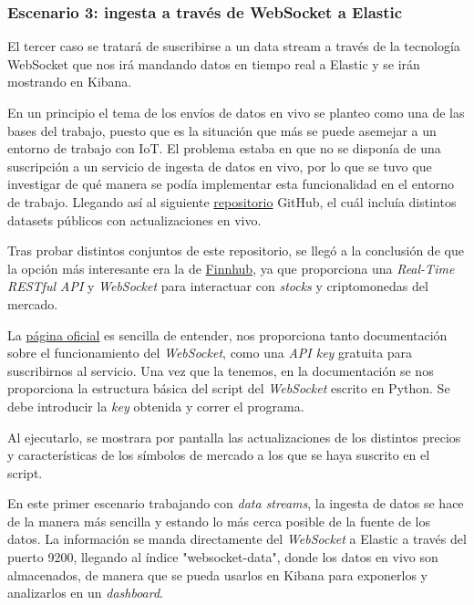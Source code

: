 \subsubsection{Escenario 3: ingesta a través de WebSocket a Elastic}

El tercer caso se tratará de suscribirse a un data stream a través de la tecnología WebSocket que nos irá mandando datos en tiempo real a Elastic y se irán mostrando en Kibana.

En un principio el tema de los envíos de datos en vivo se planteo como una de las bases del trabajo, puesto que es la situación que más se puede asemejar a un entorno de trabajo con IoT. El problema estaba en que no se disponía de una suscripción a un servicio de ingesta de datos en vivo, por lo que se tuvo que investigar de qué manera se podía implementar esta funcionalidad en el entorno de trabajo. Llegando así al siguiente \href{https://github.com/ColinEberhardt/awesome-public-streaming-datasets}{repositorio} GitHub, el cuál incluía distintos datasets públicos con actualizaciones en vivo.

Tras probar distintos conjuntos de este repositorio, se llegó a la conclusión de que la opción más interesante era la de \href{https://finnhub.io/docs/api/websocket-trades}{Finnhub}, ya que proporciona una \textit{Real-Time RESTful API} y \textit{WebSocket} para interactuar con \textit{stocks} y criptomonedas del mercado.

La \href{https://finnhub.io/}{página oficial} es sencilla de entender, nos proporciona tanto documentación sobre el funcionamiento del \textit{WebSocket}, como una \textit{API key} gratuita para suscribirnos al servicio. Una vez que la tenemos, en la documentación se nos proporciona la estructura básica del script del \textit{WebSocket} escrito en Python. Se debe introducir la \textit{key} obtenida y correr el programa. 

Al ejecutarlo, se mostrara por pantalla las actualizaciones de los distintos precios y características de los símbolos de mercado a los que se haya suscrito en el script. 

En este primer escenario trabajando con \textit{data streams}, la ingesta de datos se hace de la manera más sencilla y estando lo más cerca posible de la fuente de los datos. La información se manda directamente del \textit{WebSocket} a Elastic a través del puerto 9200, llegando al índice "websocket-data", donde los datos en vivo son almacenados, de manera que se pueda usarlos en Kibana para exponerlos y analizarlos en un \textit{dashboard}.

